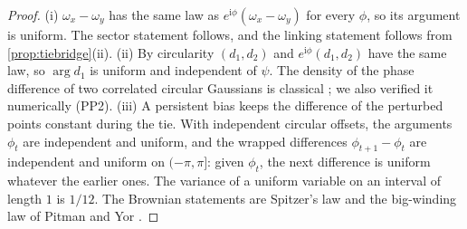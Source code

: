 \documentclass[11pt]{article}
\theoremstyle{definition}\newtheorem{definition}[theorem]{Definition}\newtheorem{remark}[theorem]{Remark}\newtheorem{example}[theorem]{Example}\newtheorem{problem}[theorem]{Open problem}\crefname{problem}{Problem}{Problems}
\begin{document}
\begin{proof}
(i) $\omega_x-\omega_y$ has the same law as $e^{\mathrm i\phi}(\omega_x-\omega_y)$ for every $\phi$, so its argument is uniform. The sector statement follows, and the linking statement follows from \cref{prop:tiebridge}(ii). (ii) By circularity $(d_1,d_2)$ and $e^{\mathrm i\phi}(d_1,d_2)$ have the same law, so $\arg d_1$ is uniform and independent of $\psi$. The density of the phase difference of two correlated circular Gaussians is classical \cite{Goodman1985}; we also verified it numerically (PP2). (iii) A persistent bias keeps the difference of the perturbed points constant during the tie. With independent circular offsets, the arguments $\phi_t$ are independent and uniform, and the wrapped differences $\phi_{t+1}-\phi_t$ are independent and uniform on $(-\pi,\pi]$: given $\phi_t$, the next difference is uniform whatever the earlier ones. The variance of a uniform variable on an interval of length $1$ is $1/12$. The Brownian statements are Spitzer's law \cite{Spitzer1958} and the big-winding law of Pitman and Yor \cite{PitmanYor1986}.
\end{proof}
\end{document}
